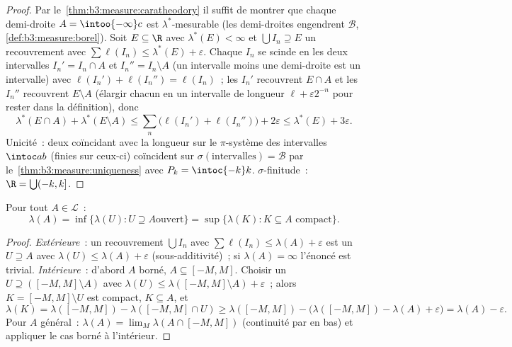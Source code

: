 \begin{proof}
Par le~\cref{thm:b3:measure:caratheodory} il suffit de
montrer que chaque demi-droite $A = \intoo{-\infty}c$ est
$\lambda^*$-mesurable (les demi-droites engendrent $\mathcal
B$, \cref{def:b3:measure:borel}). Soit $E \subseteq \R$ avec
$\lambda^*(E) < \infty$ et $\bigcup I_n \supseteq E$ un
recouvrement avec $\sum\ell(I_n) \leq \lambda^*(E) +
\varepsilon$. Chaque $I_n$ se scinde en les deux intervalles
$I_n' = I_n \cap A$ et $I_n'' = I_n\setminus A$ (un
intervalle moins une demi-droite est un intervalle) avec
$\ell(I_n') + \ell(I_n'') = \ell(I_n)$~; les $I_n'$
recouvrent $E \cap A$ et les $I_n''$ recouvrent $E \setminus
A$ (élargir chacun en un intervalle  de longueur $\ell +
\varepsilon2^{-n}$ pour rester dans la définition), donc
\[
\lambda^*(E\cap A) + \lambda^*(E\setminus A)
\leq \sum_n\bigl(\ell(I_n') + \ell(I_n'')\bigr) + 2\varepsilon
\leq \lambda^*(E) + 3\varepsilon .
\]
Unicité~: deux  coïncidant avec la longueur sur le
$\pi$-système des intervalles $\intoc ab$ (finies sur ceux-ci)
coïncident sur $\sigma(\text{intervalles}) = \mathcal B$ par
le~\cref{thm:b3:measure:uniqueness} avec $P_k =
\intoc{-k}k$. $\sigma$-finitude~: $\R = \bigcup(-k, k]$.
\end{proof}

\begin{theorem}[Régularité]\label{thm:b3:measure:regularity}
Pour tout $A \in \mathcal L$~:
\[
\lambda(A) = \inf\{\lambda(U) : U \supseteq A \text{
ouvert}\}
= \sup\{\lambda(K) : K \subseteq A \text{ compact}\}.
\]
\end{theorem}

\begin{proof}
\emph{Extérieure}~: un recouvrement $\bigcup I_n$ avec
$\sum\ell(I_n) \leq \lambda(A) + \varepsilon$ est un 
$U \supseteq A$ avec $\lambda(U) \leq \lambda(A) +
\varepsilon$ (sous-additivité)~; si $\lambda(A) = \infty$
l'énoncé est trivial. \emph{Intérieure}~: d'abord $A$ borné,
$A \subseteq [-M, M]$. Choisir un  $U \supseteq
([-M,M]\setminus A)$ avec $\lambda(U) \leq
\lambda([-M,M]\setminus A) + \varepsilon$~; alors $K = [-M,
M]\setminus U$ est compact, $K \subseteq A$, et
\[
\lambda(K) = \lambda([-M,M]) - \lambda([-M,M]\cap U)
\geq \lambda([-M,M]) - \bigl(\lambda([-M,M]) - \lambda(A) +
\varepsilon\bigr) = \lambda(A) - \varepsilon .
\]
Pour $A$ général~: $\lambda(A) = \lim_M\lambda(A\cap[-M,M])$
(continuité par en bas) et appliquer le cas borné à
l'intérieur.
\end{proof}

